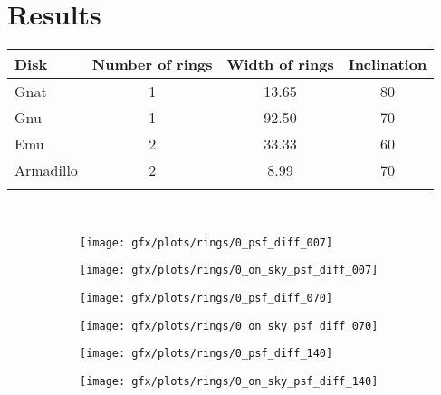 \chapter{Results}

\begin{tabular}{lccc}
Disk      & Number of rings & Width of rings & Inclination \\
\hline
Gnat      & 1               & 13.65          & 80          \\
Gnu       & 1               & 92.50          & 70          \\
Emu       & 2               & 33.33          & 60          \\
Armadillo & 2               & 8.99           & 70          \\
\hline
\label{tab: param_study}
\end{tabular}
\\

\begin{figure}[h!]
  
  \begin{subfigure}[b]{0.6\textwidth}
    \texttt{[image: gfx/plots/rings/0\_psf\_diff\_007]}
    \caption{}
  \end{subfigure}%
  \begin{subfigure}[b]{0.6\textwidth}
    \texttt{[image: gfx/plots/rings/0\_on\_sky\_psf\_diff\_007]}
    \caption{}
  \end{subfigure}      
  
  \begin{subfigure}[b]{0.6\textwidth}
    \texttt{[image: gfx/plots/rings/0\_psf\_diff\_070]}
    \caption{}
  \end{subfigure}%
  \begin{subfigure}[b]{0.6\textwidth}
    \texttt{[image: gfx/plots/rings/0\_on\_sky\_psf\_diff\_070]}
    \caption{}
  \end{subfigure}
        
  \begin{subfigure}[b]{0.6\textwidth}
    \texttt{[image: gfx/plots/rings/0\_psf\_diff\_140]}
    \caption{}
  \end{subfigure}%
  \begin{subfigure}[b]{0.6\textwidth}
    \texttt{[image: gfx/plots/rings/0\_on\_sky\_psf\_diff\_140]}
    \caption{}
  \end{subfigure}

  \caption{}
  \label{fig:psfs_evolving}
\end{figure}
